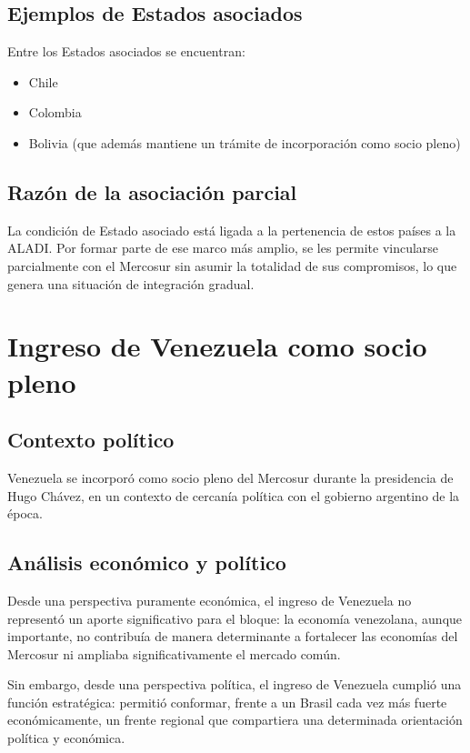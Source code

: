 \documentclass[12pt,oneside]{book}
\begin{document}
\subsection{Ejemplos de Estados asociados}

Entre los Estados asociados se encuentran:

\begin{itemize}
\item Chile
\item Colombia
\item Bolivia (que además mantiene un trámite de incorporación como socio pleno)
\end{itemize}

\subsection{Razón de la asociación parcial}

La condición de Estado asociado está ligada a la pertenencia de estos países a la ALADI. Por formar parte de ese marco más amplio, se les permite vincularse parcialmente con el Mercosur sin asumir la totalidad de sus compromisos, lo que genera una situación de integración gradual.

\section{Ingreso de Venezuela como socio pleno}

\subsection{Contexto político}

Venezuela se incorporó como socio pleno del Mercosur durante la presidencia de Hugo Chávez, en un contexto de cercanía política con el gobierno argentino de la época.

\subsection{Análisis económico y político}

Desde una perspectiva puramente económica, el ingreso de Venezuela no representó un aporte significativo para el bloque: la economía venezolana, aunque importante, no contribuía de manera determinante a fortalecer las economías del Mercosur ni ampliaba significativamente el mercado común.

Sin embargo, desde una perspectiva política, el ingreso de Venezuela cumplió una función estratégica: permitió conformar, frente a un Brasil cada vez más fuerte económicamente, un frente regional que compartiera una determinada orientación política y económica.
\end{document}
